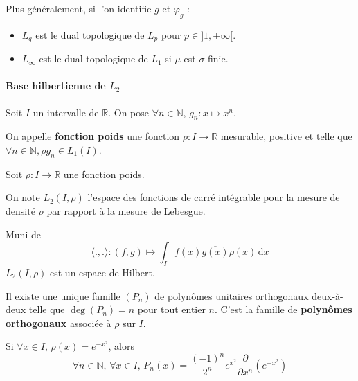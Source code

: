 
  \begin{remark}
    Plus généralement, si l'on identifie $g$ et $\varphi_g$ :
    \begin{itemize}
      \item $L_q$ est le dual topologique de $L_p$ pour $p \in ]1, +\infty[$.
      \item $L_\infty$ est le dual topologique de $L_1$ si $\mu$ est $\sigma$-finie.
    \end{itemize}
  \end{remark}

  \paragraph{Base hilbertienne de \texorpdfstring{$L_2$}{L₂}}


  Soit $I$ un intervalle de $\mathbb{R}$. On pose $\forall n \in \mathbb{N}$, $g_n : x \mapsto x^n$.

  \begin{definition}
    On appelle \textbf{fonction poids} une fonction $\rho : I \rightarrow \mathbb{R}$ mesurable, positive et telle que $\forall n \in \mathbb{N}, \rho g_n \in L_1(I)$.
  \end{definition}

  Soit $\rho : I \rightarrow \mathbb{R}$ une fonction poids.

  \begin{notation}
    On note $L_2(I, \rho)$ l'espace des fonctions de carré intégrable pour la mesure de densité $\rho$ par rapport à la mesure de Lebesgue.
  \end{notation}

  \begin{proposition}
    Muni de
    \[ \langle ., . \rangle : (f,g) \mapsto \int_I f(x) \overline{g(x)} \rho(x) \, \mathrm{d}x \]
    $L_2(I, \rho)$ est un espace de Hilbert.
  \end{proposition}

  \begin{theorem}
    Il existe une unique famille $(P_n)$ de polynômes unitaires orthogonaux deux-à-deux telle que $\deg(P_n) = n$ pour tout entier $n$. C'est la famille de \textbf{polynômes orthogonaux} associée à $\rho$ sur $I$.
  \end{theorem}

  \begin{example}
    Si $\forall x \in I, \, \rho(x) = e^{-x^2}$, alors
    \[ \forall n \in \mathbb{N}, \, \forall x \in I, \, P_n(x) = \frac{(-1)^n}{2^n} e^{x^2} \frac{\partial}{\partial x^n} \left( e^{-x^2} \right) \]
  \end{example}

